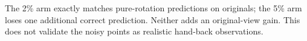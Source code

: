 The 2\% arm exactly matches pure-rotation predictions on originals; the 5\% arm loses one additional correct prediction. Neither adds an original-view gain. This does not validate the noisy points as realistic hand-back observations.
